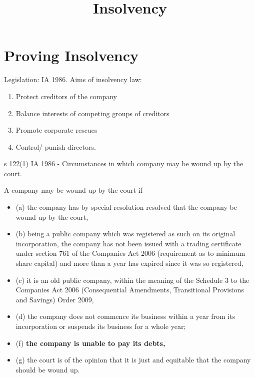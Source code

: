 \documentclass[
]{article}
\title{Insolvency}
\author{}
\date{}
\providecommand{\tightlist}{%
  \setlength{\itemsep}{0pt}\setlength{\parskip}{0pt}}
\newenvironment{env-99928e31-e9c7-4b95-96ac-39649baaf1f5}
{
    \savenotes\tcolorbox[blanker,breakable,left=5pt,borderline west={2pt}{-4pt}{green}]
}
{
    \endtcolorbox\spewnotes
}
\begin{document}
\maketitle

{
\setcounter{tocdepth}{3}
\tableofcontents
}
\hypertarget{proving-insolvency}{%
\section{Proving Insolvency}\label{proving-insolvency}}

Legislation: IA 1986. Aims of insolvency law:

\begin{enumerate}
\tightlist
\item
  Protect creditors of the company
\item
  Balance interests of competing groups of creditors
\item
  Promote corporate rescues
\item
  Control/ punish directors.
\end{enumerate}

\begin{env-99928e31-e9c7-4b95-96ac-39649baaf1f5}

s 122(1) IA 1986 - Circumstances in which company may be wound up by the
court.

A company may be wound up by the court if---

\begin{itemize}
\tightlist
\item
  (a) the company has by special resolution resolved that the company be
  wound up by the court,
\item
  (b) being a public company which was registered as such on its
  original incorporation, the company has not been issued with a trading
  certificate under section 761 of the Companies Act 2006 (requirement
  as to minimum share capital) and more than a year has expired since it
  was so registered,
\item
  (c) it is an old public company, within the meaning of the Schedule 3
  to the Companies Act 2006 (Consequential Amendments, Transitional
  Provisions and Savings) Order 2009,
\item
  (d) the company does not commence its business within a year from its
  incorporation or suspends its business for a whole year;
\item
  (f) \textbf{the company is unable to pay its debts,}
\item
  (g) the court is of the opinion that it is just and equitable that the
  company should be wound up.
\end{itemize}

\end{env-99928e31-e9c7-4b95-96ac-39649baaf1f5}
\end{document}
